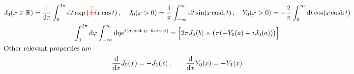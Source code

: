 \begin{subequations}
    \begin{gather}
        J_0(x\in\mathbb{R})=\frac{1}{2\pi}\int_0^{2\pi}\text{d} t\exp{(\textcolor{red}{\overset{?}{\pm}}{i}x\cos t)}\,,\quad
        J_0(x>0)=\frac{1}{\pi}\int_{-\infty}^\infty\text{d} t\sin(x\cosh t)\,,\quad Y_0(x>0)=-\frac{2}{\pi}\int_0^\infty\text{d} t\cos(x\cosh t)\\
        \int_0^{2\pi}\text{d}\varphi\int_{-\infty}^\infty\text{d}\eta e^{{i}(a\cosh\eta-b\cos\varphi)}=\Big[2\pi J_0(b)\times\big(\pi(-Y_0(a)+{i} J_0(a))\big)\Big]\\
        \intertext{Other relevant properties are}
        \frac{\text{d}}{\text{d} x}J_0(x)=-J_1(x)\,,\qquad\frac{\text{d}}{\text{d} x}Y_0(x)=-Y_1(x)
        \label{eq:BesselFunctions}
    \end{gather}
\end{subequations}





